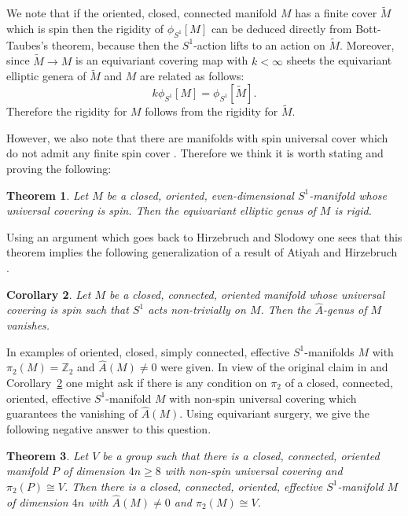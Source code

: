 \documentclass[a4paper, 11pt]{amsart}
\newtheorem{theorem}{Theorem}[section]
\newtheorem{corollary}[theorem]{Corollary}
\theoremstyle{definition}
\theoremstyle{remark}
\numberwithin{equation}{section}
\begin{document}
We note that if the oriented, closed, connected manifold \(M\) has a finite cover \(\tilde{M}\) which is spin then the rigidity of \(\phi_{S^1}[M]\) can be deduced directly from Bott-Taubes's theorem, because then the \(S^1\)-action lifts to an action on \(\tilde{M}\).
Moreover, since \(\tilde{M}\rightarrow M\) is an equivariant covering map with \(k<\infty\) sheets the equivariant elliptic genera of \(\tilde{M}\) and \(M\) are related as follows:
\[k\phi_{S^1}[M]=\phi_{S^1}[\tilde{M}].\]
Therefore the rigidity for \(M\) follows from the rigidity for \(\tilde{M}\).


However, we also note that there are manifolds with spin universal cover which do not admit any finite spin cover \cite{Mathoverflow}. Therefore we think it is worth stating and proving the following:

\begin{theorem}
  \label{sec:main}
  Let \(M\) be a closed, oriented, even-dimensional \(S^1\)-manifold whose universal covering is spin.
  Then the equivariant elliptic genus of \(M\) is rigid.
\end{theorem}

Using an argument which goes back to Hirzebruch and Slodowy \cite{MR1066570} one sees that this theorem implies the following generalization of a result of Atiyah and Hirzebruch \cite{MR0278334}.

\begin{corollary}
  \label{sec:introduction-2}
    Let \(M\) be a closed, connected, oriented manifold whose universal covering is spin such that \(S^1\) acts non-trivially on \(M\).
  Then the \(\hat{A}\)-genus of \(M\) vanishes.
\end{corollary}

In \cite{MR2600123} examples of oriented, closed, simply connected, effective \(S^1\)-manifolds \(M\) with \(\pi_2(M)=\mathbb{Z}_2\) and \(\hat{A}(M)\neq 0\) were given.
In view of the original claim in \cite{MR1979364} and Corollary~\ref{sec:introduction-2} one might ask if there is any condition on \(\pi_2\) of a closed, connected, oriented, effective \(S^1\)-manifold \(M\) with non-spin universal covering which guarantees the vanishing of \(\hat{A}(M)\).
Using equivariant surgery, we give the following negative answer to this question.

\begin{theorem}
 \label{sec:introduction-1}
  Let \(V\) be a group such that there is a closed, connected, oriented manifold \(P\) of dimension \(4n\geq 8\) with non-spin universal covering and \(\pi_2(P)\cong V\).
  Then there is a closed, connected, oriented, effective \(S^1\)-manifold \(M\) of dimension \(4n\) with \(\hat{A}(M)\neq 0\) and \(\pi_2(M)\cong V\).
\end{theorem}
\end{document}

